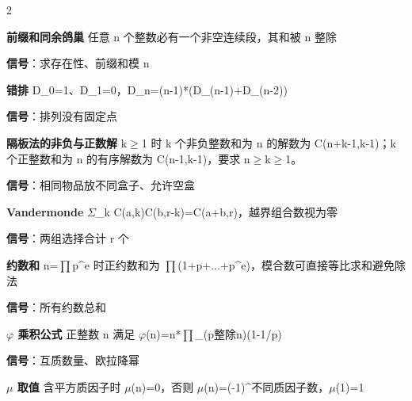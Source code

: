 \documentclass[UTF8,fontset=fandol,a4paper,twoside]{ctexart}
\begin{document}
\begin{multicols}{2}
\par\textbf{前缀和同余鸽巢}\quad
任意 n 个整数必有一个非空连续段，其和被 n 整除\par
\textbf{信号}：求存在性、前缀和模 n\par
\par\textbf{错排}\quad
D\_0=\allowbreak{}1、D\_1=\allowbreak{}0，D\_n=\allowbreak{}(\allowbreak{}n-\allowbreak{}1)\allowbreak{}*(\allowbreak{}D\_(\allowbreak{}n-\allowbreak{}1)\allowbreak{}+\allowbreak{}D\_(\allowbreak{}n-\allowbreak{}2)\allowbreak{})\allowbreak{}\par
\textbf{信号}：排列没有固定点\par
\par\textbf{隔板法的非负与正数解}\quad
k\ensuremath{\ge}1 时 k 个非负整数和为 n 的解数为 C(\allowbreak{}n+\allowbreak{}k-\allowbreak{}1,\allowbreak{}k-\allowbreak{}1)\allowbreak{}；k 个正整数和为 n 的有序解数为 C(\allowbreak{}n-\allowbreak{}1,\allowbreak{}k-\allowbreak{}1)\allowbreak{}，要求 n\ensuremath{\ge}k\ensuremath{\ge}1。\par
\textbf{信号}：相同物品放不同盒子、允许空盒\par
\par\textbf{Vandermonde}\quad
\ensuremath{\Sigma}\_k C(\allowbreak{}a,\allowbreak{}k)\allowbreak{}C(\allowbreak{}b,\allowbreak{}r-\allowbreak{}k)\allowbreak{}=\allowbreak{}C(\allowbreak{}a+\allowbreak{}b,\allowbreak{}r)\allowbreak{}，越界组合数视为零\par
\textbf{信号}：两组选择合计 r 个\par
\par\textbf{约数和}\quad
n=\allowbreak{}\ensuremath{\prod}p\textasciicircum{}e 时正约数和为 \ensuremath{\prod}(\allowbreak{}1+\allowbreak{}p+\allowbreak{}.\allowbreak{}.\allowbreak{}.\allowbreak{}+\allowbreak{}p\textasciicircum{}e)\allowbreak{}，模合数可直接等比求和避免除法\par
\textbf{信号}：所有约数总和\par
\par\textbf{\ensuremath{\varphi} 乘积公式}\quad
正整数 n 满足 \ensuremath{\varphi}(\allowbreak{}n)\allowbreak{}=\allowbreak{}n*\ensuremath{\prod}\_(\allowbreak{}p整除n)\allowbreak{}(\allowbreak{}1-\allowbreak{}1/\allowbreak{}p)\allowbreak{}\par
\textbf{信号}：互质数量、欧拉降幂\par
\par\textbf{\ensuremath{\mu} 取值}\quad
含平方质因子时 \ensuremath{\mu}(\allowbreak{}n)\allowbreak{}=\allowbreak{}0，否则 \ensuremath{\mu}(\allowbreak{}n)\allowbreak{}=\allowbreak{}(\allowbreak{}-\allowbreak{}1)\allowbreak{}\textasciicircum{}不同质因子数，\ensuremath{\mu}(\allowbreak{}1)\allowbreak{}=\allowbreak{}1\par

\end{multicols}
\end{document}
